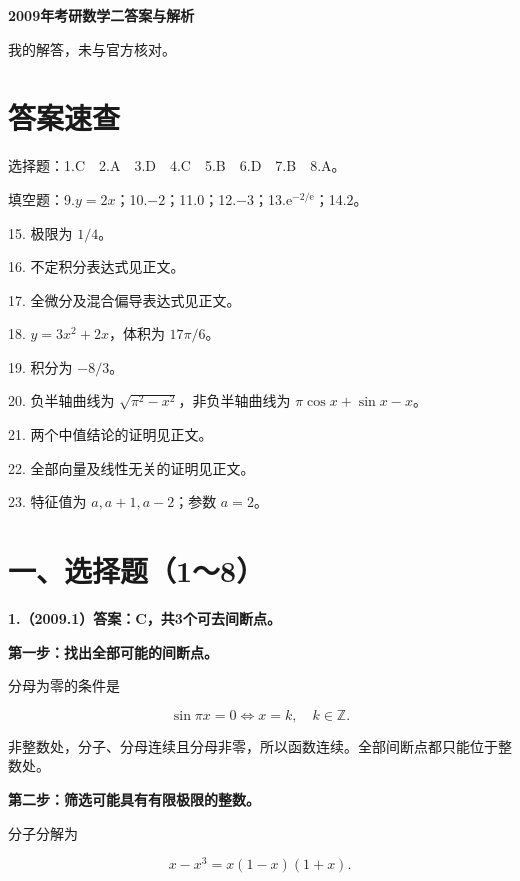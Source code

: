\documentclass[UTF8,11pt,fontset=windows]{ctexart}
\begin{document}
{\LARGE\bfseries 2009年考研数学二答案与解析\par}\vspace{6pt}

\begingroup\color{gray}我的解答，未与官方核对。\par\endgroup

\section*{答案速查}

\begingroup\color{gray}选择题：1.C　2.A　3.D　4.C　5.B　6.D　7.B　8.A。\par\endgroup

\begingroup\color{gray}填空题：9.$y=2x$；10.$-2$；11.$0$；12.$-3$；13.$\mathrm e^{-2/\mathrm e}$；14.$2$。\par\endgroup

15. 极限为 $1/4$。

16. 不定积分表达式见正文。

17. 全微分及混合偏导表达式见正文。

18. $y=3x^2+2x$，体积为 $17\pi/6$。

19. 积分为 $-8/3$。

20. 负半轴曲线为 $\sqrt{\pi^2-x^2}$，非负半轴曲线为 $\pi\cos x+\sin x-x$。

21. 两个中值结论的证明见正文。

22. 全部向量及线性无关的证明见正文。

23. 特征值为 $a,a+1,a-2$；参数 $a=2$。

\clearpage

\section*{一、选择题（1～8）}

\textbf{1.（2009.1）答案：C，共3个可去间断点。}

\textbf{第一步：找出全部可能的间断点。}

分母为零的条件是

$$
\sin\pi x=0\Longleftrightarrow x=k,\quad k\in\mathbb Z.
$$

非整数处，分子、分母连续且分母非零，所以函数连续。全部间断点都只能位于整数处。

\textbf{第二步：筛选可能具有有限极限的整数。}

分子分解为

$$
x-x^3=x(1-x)(1+x).
$$
\end{document}
